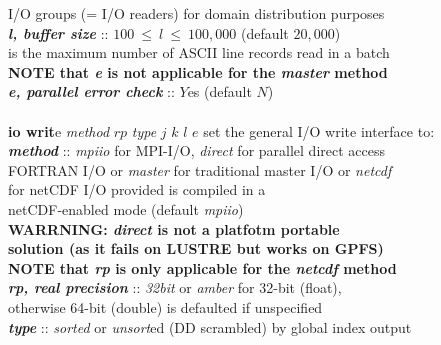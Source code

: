 \begin{tabbing}
\>                                              \> \phantom{xxxx} I/O groups (= I/O readers) for domain distribution purposes \\
\>                                              \> {\bf \em l, buffer size} :: $100~\le~l~\le~100,000$ (default $20,000$) \\
\>                                              \> \phantom{x} is the maximum number of ASCII line records read in a batch \\
\>                                              \> {\bf NOTE that {\em e} is not applicable for the {\em master} method} \\
\>                                              \> \phantom{xxx} {\bf \em e, parallel error check} :: $Y$es (default $N$) \\
\>                                              \> \\
\> {\bf io writ}e {\em method} $rp$ {\em type} $j$ $k$ $l$ $e$ \> set the general I/O write interface to: \\
\>                                              \> {\bf \em method} :: {\em mpiio} for MPI-I/O, {\em direct} for parallel direct access \\
\>                                              \> \phantom{x} FORTRAN I/O or {\em master} for traditional master I/O or {\em netcdf} \\
\>                                              \> \phantom{x} for netCDF I/O provided \D is compiled in a \\
\>                                              \> \phantom{x} netCDF-enabled mode (default {\em mpiio}) \\
\>                                              \> \phantom{x} {\bf WARRNING: {\em direct} is not a platfotm portable} \\
\>                                              \> \phantom{x} {\bf solution (as it fails on LUSTRE but works on GPFS)} \\
\>                                              \> {\bf NOTE that {\em rp} is only applicable for the {\em netcdf} method} \\
\>                                              \> {\bf \em rp, real precision} :: {\em 32bit} or {\em amber} for 32-bit (float), \\
\>                                              \> \phantom{x} otherwise 64-bit (double) is defaulted if unspecified \\
\>                                              \> {\bf \em type} :: {\em sorted} or {\em unsort}ed (DD scrambled) by global index output \\

\end{tabbing}
